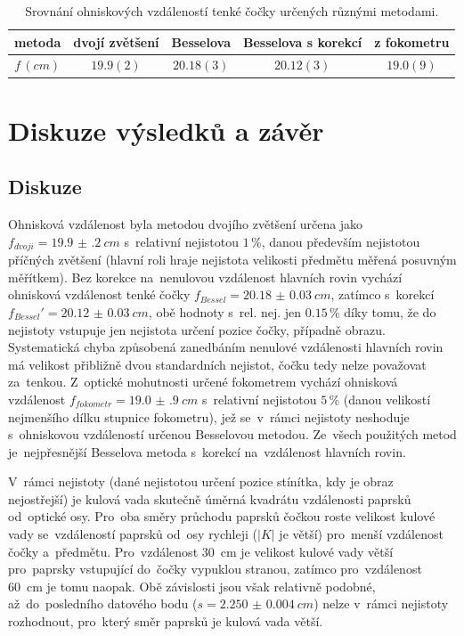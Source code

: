 \documentclass{../concepts/titul_zprava_p/prepareprotokolZprava} %
\begin{document}
\begin{table}[!htbp]
\centering
\caption{Srovnání ohniskových vzdáleností tenké čočky určených různými metodami.}
\begin{tabular}{c|cccc}
 \toprule
 metoda & dvojí zvětšení & Besselova & Besselova s korekcí & z fokometru \\
 \midrule
 $f\,(\unit{cm})$ & $19.9(2)$ & $20.18(3)$ & $20.12(3)$ & $19.0(9)$ \\
 \bottomrule
\end{tabular}
\label{tab:srovnani}
\end{table}

\section{Diskuze výsledků a závěr}
\subsection{Diskuze}
Ohnisková vzdálenost byla metodou dvojího zvětšení určena jako $f_{dvoji} = \qty{19.9(2)}{cm}$ s~relativní nejistotou $1\,\%$,
danou především nejistotou příčných zvětšení (hlavní roli hraje nejistota velikosti předmětu měřená posuvným měřítkem).
Bez korekce na~nenulovou vzdálenost hlavních rovin vychází ohnisková vzdálenost tenké čočky
$f_{Bessel} = \qty{20.18(3)}{cm}$, zatímco s~korekcí $f_{Bessel}' = \qty{20.12(3)}{cm}$, obě hodnoty s~rel. nej. jen $0.15\,\%$
díky tomu, že do nejistoty vstupuje jen nejistota určení pozice čočky, případně obrazu.
Systematická chyba způsobená zanedbáním nenulové
vzdálenosti hlavních rovin má velikost přibližně dvou standardních nejistot, čočku tedy nelze považovat za~tenkou.
Z~optické mohutnosti určené fokometrem vychází ohnisková vzdálenost $f_{fokometr} = \qty{19.0(9)}{cm}$ s~relativní nejistotou $5\,\%$
(danou velikostí nejmenšího dílku stupnice fokometru), jež se~v~rámci nejistoty neshoduje s~ohniskovou vzdáleností
určenou Besselovou metodou. Ze~všech použitých metod je~nejpřesnější Besselova metoda s~korekcí na~vzdálenost hlavních rovin.

V~rámci nejistoty (dané nejistotou určení pozice stínítka, kdy je obraz nejostřejší) je kulová vada skutečně úměrná
kvadrátu vzdálenosti paprsků od~optické osy. Pro~oba směry průchodu paprsků čočkou roste velikost kulové vady se~vzdáleností
paprsků od~osy rychleji ($|K|$ je větší) pro~menší vzdálenost čočky a~předmětu. Pro~vzdálenost \qty{30}{cm} je velikost kulové vady
větší pro~paprsky vstupující do~čočky vypuklou stranou, zatímco pro~vzdálenost \qty{60}{cm} je tomu naopak. Obě závislosti
jsou však relativně podobné, až~do~posledního datového bodu ($s=\qty{2.250(4)}{cm}$) nelze v~rámci nejistoty rozhodnout,
pro~který směr paprsků je kulová vada větší.
\end{document}
